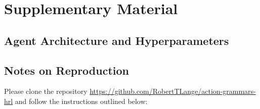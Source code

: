 \documentclass[colorinlistoftodos]{article}
\theoremstyle{definition}
\begin{document}
\newpage
\listoftodos

\setlength{\bibsep}{3pt plus 0.3ex}

{\tiny }

\section*{Supplementary Material}

\subsection*{Agent Architecture and Hyperparameters}



\subsection*{Notes on Reproduction}

Please clone the repository \url{https://github.com/RobertTLange/action-grammars-hrl} and follow the instructions outlined below:
\end{document}
